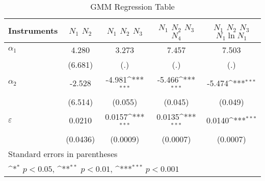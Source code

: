\begin{table}[htbp]\centering
\newcommand{\sym}[1]{\ifmmode^{#1}\else\(^{#1}\)\fi}
\caption{GMM Regression Table}
\begin{tabular}{l*{4}{c}}
\hline\hline
Instruments           &\multicolumn{1}{c}{$N_1$ $N_2$}&\multicolumn{1}{c}{$N_1$ $N_2$ $N_3$}&\multicolumn{1}{c}{$N_1$ $N_2$ $N_3$ $N_4$}&\multicolumn{1}{c}{$N_1$ $N_2$ $N_3$ $N_1\ln N_1$}\\
\hline
$\alpha_1$           &       4.280         &       3.273         &       7.457         &       7.503         \\
                    &     (6.681)         &     (.)         &     (.)         &     (.)         \\
\hline
$\alpha_2$           &      -2.528         &      -4.981\sym{***}         &      -5.466\sym{***}         &      -5.474\sym{***}         \\
                    &    (6.514)         &    (0.055)         &    (0.045)         &    (0.049)         \\
\hline
$\varepsilon$       &      0.0210         &      0.0157\sym{***}         &      0.0135\sym{***}         &      0.0140\sym{***}         \\
                    &  (0.0436)         &  (0.0009)         &  (0.0007)         &  (0.0007)         \\
\hline\hline
\multicolumn{5}{l}{\footnotesize Standard errors in parentheses}\\
\multicolumn{5}{l}{\footnotesize \sym{*} \(p<0.05\), \sym{**} \(p<0.01\), \sym{***} \(p<0.001\)}\\
\end{tabular}\label{tab:gmm_table}
\end{table}
